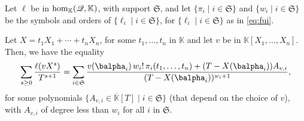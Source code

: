 \documentclass[12pt]{article}
\newcommand{\lf}{X}
\newcommand{\residueI}{\mathscr{Q}}
\def\K{\mathbb{K}}
\def\K {\ensuremath{\mathbb{K}}}
\def\Kbar {{\ensuremath{\overline{\mathbb{K}}}}}
\begin{document}
\begin{lemma}\label{lemma:formula}
  Let $\ell$ be in ${\rm hom}_\K(\residueI,\K)$, with support $\mathfrak{S}$,
  and let $\{\pi_i \mid i \in \mathfrak{S}\}$ and $\{w_i \mid i \in
  \mathfrak{S}\}$ be the symbols and orders of $\{\ell_i \mid i \in \mathfrak{S}\}$,
  for $\{\ell_i \mid i \in \mathfrak{S}\}$ as in \cref{eq:fui}.
	
  Let $\lf=t_1 X_1 + \cdots +t_n X_n$, for some $t_1,\dots,t_n$ in $\K$
  and let $v$ be in $\K[X_1,\dots,X_n]$. Then, we have the equality
  \begin{align}\label{eq:sumgenseries}
    \sum_{s \ge 0} \frac{\ell(v \lf^s)}{T^{s+1}} = \sum_{i \in \mathfrak{S}}
    \frac{ v(\balpha_i)\, w_i!\, \pi_{i}(t_1,\dots,t_n) +
      (T-\lf(\balpha_i))A_{v,i}} {(T-\lf(\balpha_i))^{w_{i}+1}},
  \end{align}
  for some polynomials $\{A_{v,i} \in \Kbar[T] \mid i \in \mathfrak{S}\}$ (that
  depend on the choice of $v$), with $A_{v,i}$ of degree less than $w_i$ for all $i$ in
  $\mathfrak{S}$.
\end{lemma}
\end{document}
